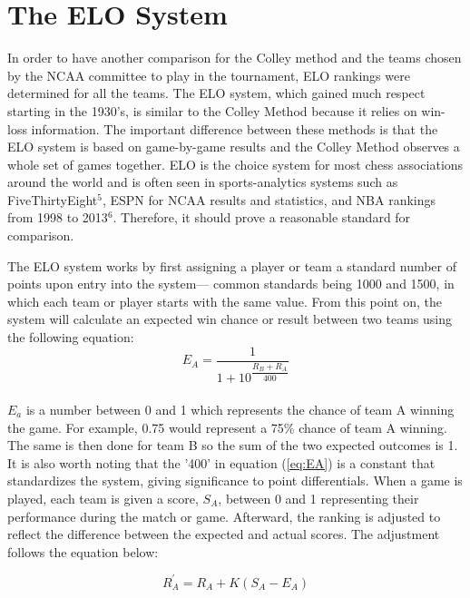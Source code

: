 \documentclass[12pt]{article}
\begin{document}
\section{The ELO System}
\label{sec:elo}

In order to have another comparison for the Colley method and the teams chosen by the NCAA committee to play in the tournament, ELO rankings were determined for all the teams. The ELO system, which gained much respect starting in the 1930's, is similar to the Colley Method because it relies on win-loss information. The important difference between these methods is that the ELO system is based on game-by-game results and the Colley Method observes a whole set of games together. ELO is the choice system for most chess associations around the world and is often seen in sports-analytics systems such as FiveThirtyEight$^{5}$, ESPN for NCAA results and statistics, and NBA rankings from 1998 to 2013$^{6}$. Therefore, it should prove a reasonable standard for comparison.

The ELO system works by first assigning a player or team a standard number of points upon entry into the system--- common standards being 1000 and 1500, in which each team or player starts with the same value. From this point on, the system will calculate an expected win chance or result between two teams using the following equation:\\

\begin{equation}
E_A = \dfrac{1}{1+10^{\dfrac{R_B + R_A}{400}}}
\label{eq:EA}
\end{equation}\\

$E_a$ is a number between 0 and 1 which represents the chance of team A winning the game.  For example, 0.75 would represent a 75\% chance of team A winning. The same is then done for team B so the sum of the two expected outcomes is 1. It is also worth noting that the '400' in equation (\ref{eq:EA}) is a constant that standardizes the system, giving significance to point differentials. When a game is played, each team is given a score, $S_A$, between 0 and 1 representing their performance during the match or game. Afterward, the ranking is adjusted to reflect the difference between the expected and actual scores. The adjustment follows the equation below:

\begin{equation}
R_A^{'} = R_A + K(S_A - E_A)
\label{eq:RA}
\end{equation}
\end{document}
